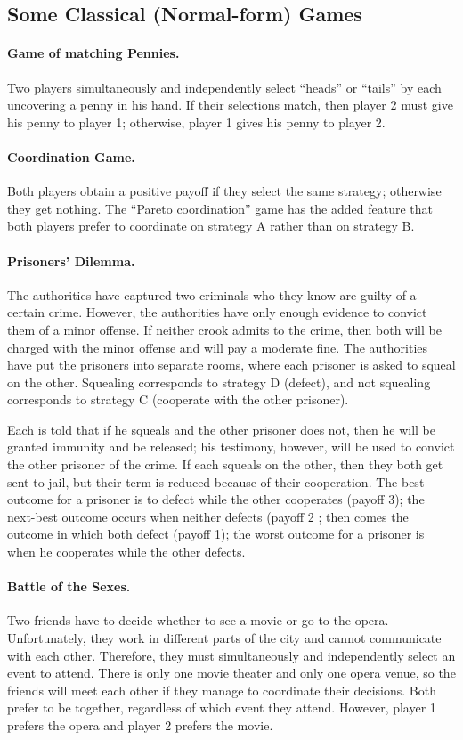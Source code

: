 \subsection{Some Classical (Normal-form) Games}

\paragraph{Game of matching Pennies.} Two players simultaneously and independently select “heads” or “tails” by each uncovering a penny in his hand. If their selections match, then player 2 must give his penny to player 1; otherwise, player 1 gives his penny to player 2.

\paragraph{Coordination Game.} Both players obtain a positive payoff if they select the same strategy; otherwise they get nothing. The “Pareto coordination” game has the added feature that both players prefer to coordinate on strategy A rather than on strategy B.

\paragraph{Prisoners’ Dilemma.} The authorities have captured two criminals who they know are guilty of a certain crime. However, the authorities have only enough evidence to convict them of a minor offense. If neither crook admits to the crime, then both will be charged with the minor offense and will pay a moderate fine. The authorities have put the prisoners into separate rooms, where each prisoner is asked to squeal on the other. Squealing corresponds to strategy D (defect), and not squealing corresponds to strategy C (cooperate with the other prisoner).

Each is told that if he squeals and the other prisoner does not, then he will be granted immunity and be released; his testimony, however, will be used to convict the other prisoner of the crime. If each squeals on the other, then they both get sent to jail, but their term is reduced because of their cooperation. The best outcome for a prisoner is to defect while the other cooperates (payoff 3); the next-best outcome occurs when neither defects (payoff 2 ; then comes the outcome in which both defect (payoff 1); the worst outcome for a prisoner is when he cooperates while the other defects.

\paragraph{Battle of the Sexes.} Two friends have to decide whether to see a movie or go to the opera. Unfortunately, they work in different parts of the city and cannot communicate with each other. Therefore, they must simultaneously and independently select an event to attend. There is only one movie theater and only one opera venue, so the friends will meet each other if they manage to coordinate their decisions. Both prefer to be together, regardless of which event they attend. However, player 1 prefers the opera and player 2 prefers the movie.

